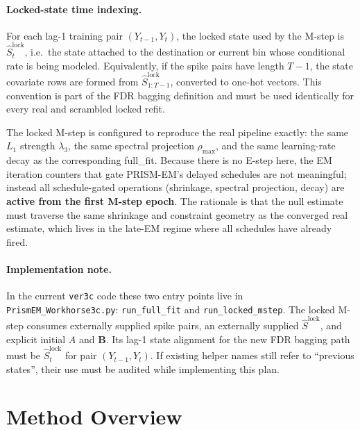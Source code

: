 \documentclass[11pt]{article}
\begin{document}
\paragraph{Locked-state time indexing.} For each lag-1 training pair
\((Y_{t-1},Y_t)\), the locked state used by the M-step is
\(\hat S^{\text{lock}}_{t}\), i.e.\ the state attached to the destination
or current bin whose conditional rate is being modeled. Equivalently, if the
spike pairs have length \(T-1\), the state covariate rows are formed from
\(\hat S^{\text{lock}}_{1:T-1}\), converted to one-hot vectors. This
convention is part of the FDR bagging definition and must be used
identically for every real and scrambled locked refit.

The locked M-step is configured to reproduce the real
pipeline exactly: the same \(L_1\) strength \(\lambda_3\), the same spectral
projection \(\rho_{\max}\), and the same learning-rate decay as the
corresponding \textsf{full\_fit}. Because there is no E-step here, the EM
iteration counters that gate PRISM-EM's delayed schedules are not
meaningful; instead all schedule-gated operations (shrinkage, spectral
projection, decay) are \textbf{active from the first M-step epoch}. The
rationale is that the null estimate must traverse the same shrinkage and
constraint geometry as the converged real estimate, which lives in the
late-EM regime where all schedules have already fired.

\paragraph{Implementation note.} In the current \texttt{ver3c} code these
two entry points live in \texttt{PrismEM\_Workhorse3c.py}:
\texttt{run\_full\_fit} and \texttt{run\_locked\_mstep}. The locked M-step
consumes externally supplied spike pairs, an externally supplied
\(\hat S^{\text{lock}}\), and explicit initial \(A\) and \(\mathbf B\). Its
lag-1 state alignment for the new FDR bagging path must be
\(\hat S^{\text{lock}}_{t}\) for pair \((Y_{t-1},Y_t)\). If existing helper
names still refer to ``previous states'', their use must be audited while
implementing this plan.

\section{Method Overview}
\end{document}
